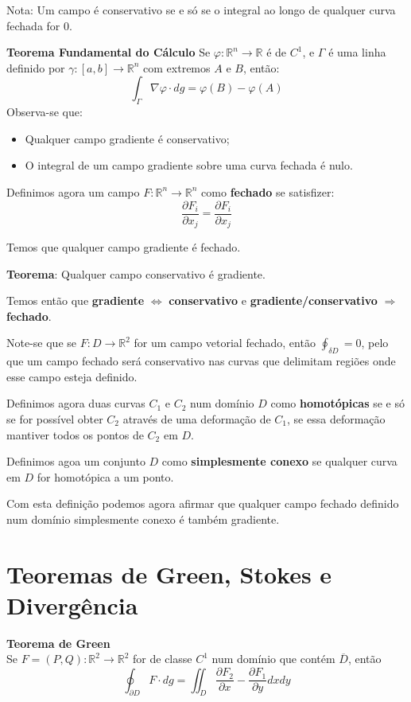 \documentclass{article}
\newcommand{\R}{\mathbb{R}}
\begin{document}
Nota: Um campo é conservativo se e só se o integral ao longo de qualquer curva fechada for 0.

\textbf{Teorema Fundamental do Cálculo}
Se $\varphi:\R^n \to \R$ é de $C^1$, e $\Gamma$ é uma linha definido por $\gamma:[a,b] \to \R^n$ com extremos $A$ e $B$, então:
$$ \int_\Gamma \nabla \varphi \cdot dg = \varphi(B) - \varphi(A) $$
Observa-se que:
\begin{itemize}
	\item Qualquer campo gradiente é conservativo;
	\item O integral de um campo gradiente sobre uma curva fechada é nulo.
\end{itemize}

Definimos agora um campo $F: \R^n \to \R^n$ como \textbf{fechado} se satisfizer:
$$ \frac{\partial F_i}{\partial x_j} = \frac{\partial F_i}{\partial x_j} $$

Temos que qualquer campo gradiente é fechado.

\textbf{Teorema}: Qualquer campo conservativo é gradiente.

Temos então que \textbf{gradiente} $\Leftrightarrow$ \textbf{conservativo} e \textbf{gradiente/conservativo} $\Rightarrow$ \textbf{fechado}.

Note-se que se $F: D \to \R^2$ for um campo vetorial fechado, então $\oint_{\delta D} = 0$, pelo que um campo fechado será conservativo nas curvas que delimitam regiões onde esse campo esteja definido.

Definimos agora duas curvas $C_1$ e $C_2$ num domínio $D$ como \textbf{homotópicas} se e só se for possível obter $C_2$ através de uma deformação de $C_1$, se essa deformação mantiver todos os pontos de $C_2$ em $D$.

Definimos agoa um conjunto $D$ como \textbf{simplesmente conexo} se qualquer curva em $D$ for homotópica a um ponto.

Com esta definição podemos agora afirmar que qualquer campo fechado definido num domínio simplesmente conexo é também gradiente.

\section{Teoremas de Green, Stokes e Divergência}
\textbf{Teorema de Green}\\
Se $F=(P,Q): \R^2 \to \R^2$ for de classe $C^1$ num domínio que contém $\overline{D}$, então
$$
\oint_{\partial D} F \cdot dg = \iint_D \frac{\partial F_2}{\partial x} - \frac{\partial F_1}{\partial y} dx dy
$$
\end{document}
